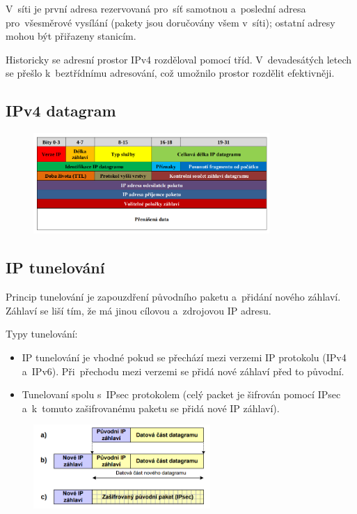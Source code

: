 V~síti je první adresa rezervovaná pro~síť samotnou a~poslední adresa pro~všesměrové vysílání (pakety jsou doručovány všem v~síti); ostatní adresy mohou být přiřazeny stanicím.

Historicky se adresní prostor IPv4 rozděloval pomocí tříd. V~devadesátých letech se přešlo k~beztřídnímu adresování, což umožnilo prostor rozdělit efektivněji.

\subsection{IPv4 datagram}

\begin{figure}[!h]
    \centering
    \includegraphics[width=0.8\textwidth]{obrazky/020.png}
\end{figure}

\subsection{IP tunelování}

Princip tunelování je zapouzdření původního paketu a~přidání nového záhlaví.
Záhlaví se liší tím, že má jinou cílovou a~zdrojovou IP adresu.

Typy tunelování:
\begin{itemize}[noitemsep]
    \item IP tunelování je vhodné pokud se přechází mezi verzemi IP protokolu (IPv4 a~IPv6). Při~přechodu mezi verzemi se přidá nové záhlaví před to původní.
    \item Tunelovaní spolu s~IPsec protokolem (celý packet je šifrován pomocí IPsec a~k~tomuto zašifrovanému paketu se přidá nové IP záhlaví).
\end{itemize}

\begin{figure}[!h]
    \centering
    \includegraphics[width=0.6\textwidth]{obrazky/021.png}
\end{figure}


